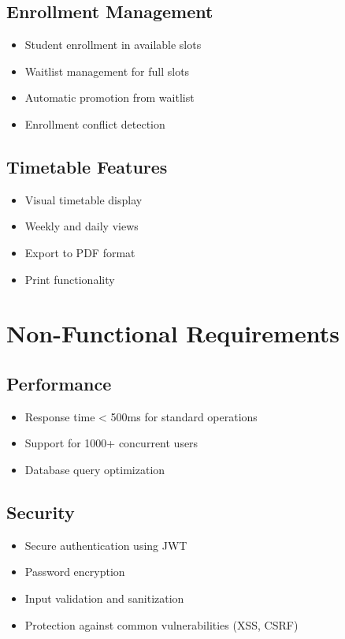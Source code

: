 \documentclass[12pt,a4paper]{report}
\begin{document}
\subsection{Enrollment Management}
\begin{itemize}[leftmargin=*]
    \item Student enrollment in available slots
    \item Waitlist management for full slots
    \item Automatic promotion from waitlist
    \item Enrollment conflict detection
\end{itemize}

\subsection{Timetable Features}
\begin{itemize}[leftmargin=*]
    \item Visual timetable display
    \item Weekly and daily views
    \item Export to PDF format
    \item Print functionality
\end{itemize}

\section{Non-Functional Requirements}

\subsection{Performance}
\begin{itemize}[leftmargin=*]
    \item Response time < 500ms for standard operations
    \item Support for 1000+ concurrent users
    \item Database query optimization
\end{itemize}

\subsection{Security}
\begin{itemize}[leftmargin=*]
    \item Secure authentication using JWT
    \item Password encryption
    \item Input validation and sanitization
    \item Protection against common vulnerabilities (XSS, CSRF)
\end{itemize}
\end{document}
